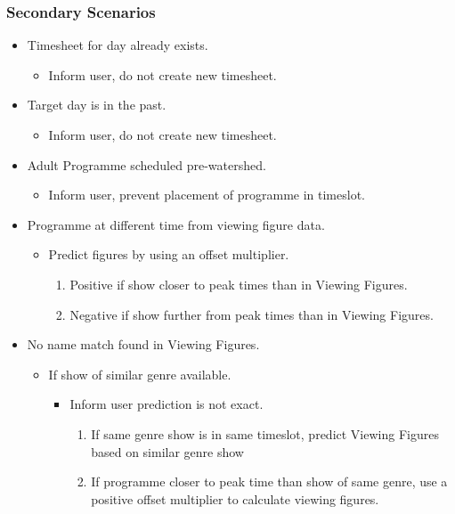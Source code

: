 \documentclass[11pt, oneside]{article}
\begin{document}
\subsubsection*{Secondary Scenarios}
\begin{itemize}
\renewcommand\labelitemi{--}
\renewcommand\labelitemii{$\circ$}
 \renewcommand{\labelenumi}{(\alph{enumi})}
\item Timesheet for day already exists.
	\begin{itemize}
	\item Inform user, do not create new timesheet.
	\end{itemize}
\item Target day is in the past.
	\begin{itemize}
	\item Inform user, do not create new timesheet.
	\end{itemize}
\item Adult Programme scheduled pre-watershed.
	\begin{itemize}
	\item Inform user, prevent placement of programme in timeslot.
	\end{itemize}
\item Programme at different time from viewing figure data.
	\begin{itemize}
	\item Predict figures by using an offset multiplier.
		\begin{enumerate}
		\item Positive if show closer to peak times than in Viewing Figures.
		\item Negative if show further from peak times than in Viewing Figures.
		\end{enumerate}
	\end{itemize}
\item No name match found in Viewing Figures.
	\begin{itemize}
	\item If show of similar genre available.
		\begin{itemize}
		\item Inform user prediction is not exact.
			\begin{enumerate} 
			\item If same genre show is in same timeslot, predict Viewing Figures based on similar genre show
			\item If programme closer to peak time than show of same genre, use a positive offset multiplier to calculate viewing figures.

\end{enumerate}
\end{itemize}
\end{itemize}
\end{itemize}
\end{document}
